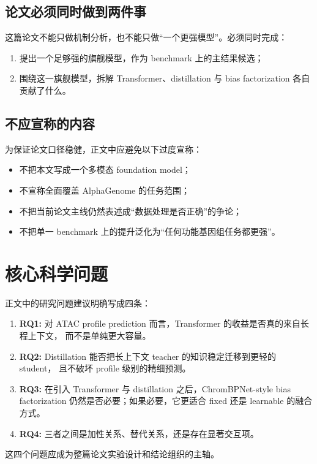 \documentclass[11pt,a4paper]{ctexart}
\begin{document}
\subsection{论文必须同时做到两件事}
这篇论文不能只做机制分析，也不能只做“一个更强模型”。必须同时完成：
\begin{enumerate}[leftmargin=2em]
  \item 提出一个足够强的旗舰模型，作为 benchmark 上的主结果候选；
  \item 围绕这一旗舰模型，拆解 Transformer、distillation 与 bias factorization
  各自贡献了什么。
\end{enumerate}

\subsection{不应宣称的内容}
为保证论文口径稳健，正文中应避免以下过度宣称：
\begin{itemize}[leftmargin=2em]
  \item 不把本文写成一个多模态 foundation model；
  \item 不宣称全面覆盖 AlphaGenome 的任务范围；
  \item 不把当前论文主线仍然表述成“数据处理是否正确”的争论；
  \item 不把单一 benchmark 上的提升泛化为“任何功能基因组任务都更强”。
\end{itemize}

\section{核心科学问题}

正文中的研究问题建议明确写成四条：
\begin{enumerate}[leftmargin=2em]
  \item \textbf{RQ1:} 对 ATAC profile prediction 而言，Transformer 的收益是否真的来自长程上下文，
  而不是单纯更大容量。
  \item \textbf{RQ2:} Distillation 能否把长上下文 teacher 的知识稳定迁移到更轻的 student，
  且不破坏 profile 级别的精细预测。
  \item \textbf{RQ3:} 在引入 Transformer 与 distillation 之后，ChromBPNet-style bias
  factorization 仍然是否必要；如果必要，它更适合 fixed 还是 learnable 的融合方式。
  \item \textbf{RQ4:} 三者之间是加性关系、替代关系，还是存在显著交互项。
\end{enumerate}

这四个问题应成为整篇论文实验设计和结论组织的主轴。
\end{document}
